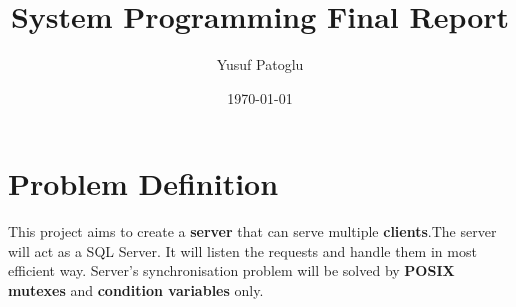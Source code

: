 \documentclass{article}
\title{System Programming Final Report}
\author{Yusuf Patoglu}
\date{\today}
\begin{document}
\maketitle

\section{Problem Definition}

    \quad This project aims to create a \textbf{server} that can serve multiple \textbf{clients}.The server will act as a SQL Server. It will listen the requests and handle them in most efficient way. Server's synchronisation problem  will be solved by \textbf{POSIX mutexes} and \textbf{condition variables} only.
\end{document}
